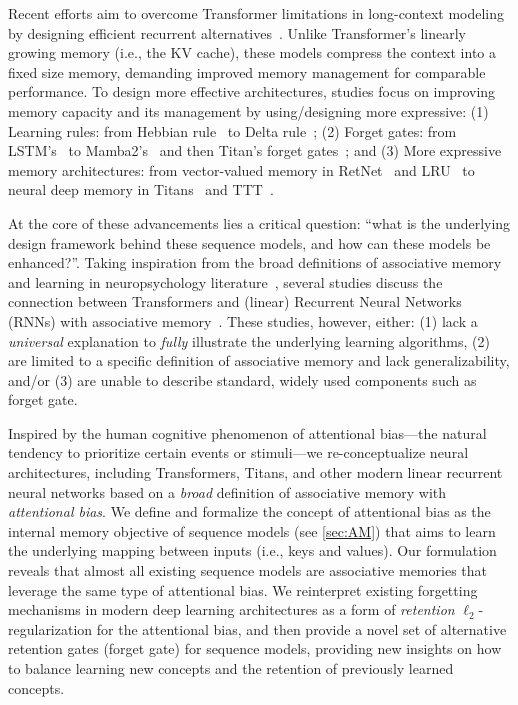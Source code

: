 \documentclass{article}
\newcommand{\citep}{\parencite}
\theoremstyle{plain}
\theoremstyle{definition}
\theoremstyle{remark}
\newcommand{\head}[1]{\vspace{1.7mm}\noindent{{\textcolor{c2}{\bf #1.}}}}
\begin{document}
Recent efforts aim to overcome Transformer limitations in long-context modeling by designing efficient recurrent alternatives~\citep{neil2017delta, smith2022simplified, behrouz2024titans}. Unlike Transformer's linearly growing memory (i.e., the KV cache), these models compress the context into a fixed size memory, demanding improved memory management for comparable performance. To design more effective architectures, studies focus on improving memory capacity and its management by using/designing more expressive: (1) Learning rules: from Hebbian rule~\citep{hebb2005organization} to Delta rule~\citep{neil2017delta}; (2) Forget gates: from LSTM's~\citep{LSTM} to Mamba2's~\citep{dao2024transformers} and then Titan's forget gates~\citep{behrouz2024titans}; and (3) More expressive memory architectures: from vector-valued memory in RetNet~\citep{sun2023retentive} and LRU~\citep{orvieto2023resurrecting} to neural deep memory in Titans~\citep{behrouz2024titans} and TTT~\citep{sun2024learning}.


At the core of these advancements lies a critical question: ``what is the underlying design framework behind these sequence models, and how can these models be enhanced?''. Taking inspiration from the broad definitions of associative memory and learning in neuropsychology literature~\citep{okano2000learning}, several studies discuss the connection between Transformers and (linear) Recurrent Neural Networks (RNNs) with associative memory~\citep{hopfield1982neural, ramsauer2021hopfield, bietti2023birth}. These studies, however, either: (1) lack a \emph{universal} explanation to \emph{fully} illustrate the underlying learning algorithms, (2) are limited to a specific definition of associative memory and lack generalizability, and/or (3) are unable to describe standard, widely used components such as forget gate.   


\head{Contributions}
Inspired by the human cognitive phenomenon of attentional bias—the natural tendency to prioritize certain events or stimuli—we re-conceptualize neural architectures, including Transformers, Titans, and other modern linear recurrent neural networks based on a \emph{broad} definition of associative memory with \emph{attentional bias}. We define and formalize the concept of {attentional bias} as the internal memory objective of sequence models (see \autoref{sec:AM}) that aims to learn the underlying mapping between inputs (i.e., keys and values). Our formulation reveals that almost all existing sequence models are associative memories that leverage the same type of attentional bias. We reinterpret existing forgetting mechanisms in modern deep learning architectures as a form of \emph{retention} $\ell_2$-regularization for the attentional bias, and then provide a novel set of alternative retention gates (forget gate) for sequence models, providing new insights on how to balance learning new concepts and the retention of previously learned concepts.
\end{document}
